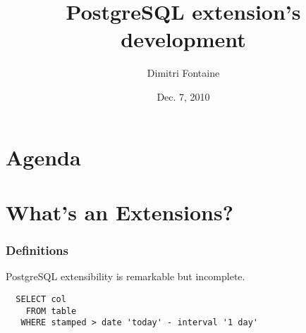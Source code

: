 \documentclass[english]{beamer}
\title{PostgreSQL extension's development}
\author{Dimitri Fontaine}
\date{Dec. 7, 2010}
\begin{document}
\frame{\titlepage}

\section*{Agenda}

\section{What's an Extensions?}

\begin{frame}[fragile]
  \frametitle{Definitions}

  \begin{center}
    PostgreSQL extensibility is remarkable but incomplete. 
  \end{center}

\begin{example}
\begin{verbatim}
  SELECT col
    FROM table
   WHERE stamped > date 'today' - interval '1 day'
\end{verbatim}
\end{example}
\end{frame}
\end{document}
